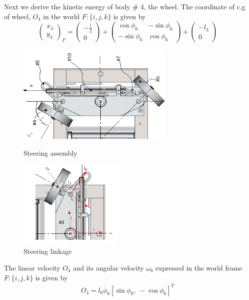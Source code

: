 { 
 Next we derive the kinetic energy of body \# 4, the wheel. 
 The coordinate of c.g of wheel, $O_4$ in the world  $F:\{i,j,k\}$  is given by \[ \begin{pmatrix}
x_{4}\\y_{4} \end{pmatrix}_F
= \begin{pmatrix}-\frac{l}{2} \\0
\end{pmatrix}+
\begin{pmatrix}
		\cos\phi_6 &  -\sin\phi_6\\ -\sin\phi_6 & \cos\phi_6
\end{pmatrix} + 
\begin{pmatrix}
			-l_3\\0
\end{pmatrix}\]
\begin{figure}
	\begin{minipage}[t]{0.5\textwidth}
		\centering
		\includegraphics[width=3in]{Chapter4/fig/SteerModel} 
		\caption{Steering assembly}\label{fig:SteerAsm}
	\end{minipage}
	\hfill
	\begin{minipage}[t]{0.5\textwidth}
		\centering
		\includegraphics[width=2in]{Chapter4/fig/link} 
		\caption{Steering linkage }\label{fig:SteerLink}
	\end{minipage}
\end{figure}
 	
  The linear velocity $\dot{O}_4$  and its angular velocity $\omega_6$  expressed in the world frame $F:\{i,j,k\}$ is given by
 \begin{eqnarray}
 \dot{O}_4=l_6\dot{\phi_6}[\sin\phi_6, ~ -\cos\phi_6] ^T
 \end{eqnarray}
 
}
